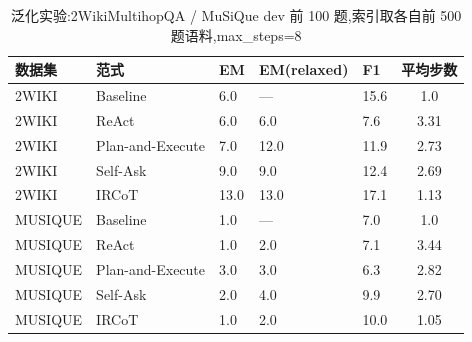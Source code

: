 \begin{table}[htbp]
\centering
\caption{泛化实验:2WikiMultihopQA / MuSiQue dev 前 100 题,索引取各自前 500 题语料,max_steps=8}
\begin{tabular}{lllllc}
\toprule
数据集 & 范式 & EM & EM(relaxed) & F1 & 平均步数 \\
\midrule
2WIKI & Baseline & 6.0 & — & 15.6 & 1.0 \\
2WIKI & ReAct & 6.0 & 6.0 & 7.6 & 3.31 \\
2WIKI & Plan-and-Execute & 7.0 & 12.0 & 11.9 & 2.73 \\
2WIKI & Self-Ask & 9.0 & 9.0 & 12.4 & 2.69 \\
2WIKI & IRCoT & 13.0 & 13.0 & 17.1 & 1.13 \\
MUSIQUE & Baseline & 1.0 & — & 7.0 & 1.0 \\
MUSIQUE & ReAct & 1.0 & 2.0 & 7.1 & 3.44 \\
MUSIQUE & Plan-and-Execute & 3.0 & 3.0 & 6.3 & 2.82 \\
MUSIQUE & Self-Ask & 2.0 & 4.0 & 9.9 & 2.70 \\
MUSIQUE & IRCoT & 1.0 & 2.0 & 10.0 & 1.05 \\
\bottomrule
\end{tabular}
\end{table}
